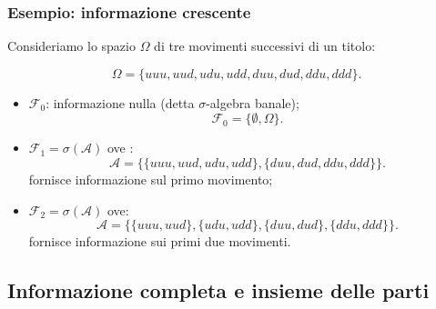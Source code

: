 \documentclass[handout]{beamer}%
\newenvironment{stepitemize}{\begin{itemize}[<+->]}{\end{itemize} }
\providecommand{\F}{\mathcal{F}}
\providecommand{\1}{\mathbf{1}}
\providecommand{\QTR}[2]{\csname #1\endcsname{#2}}
\begin{document}
\begin{frame}%
%

\frametitle{Esempio: informazione crescente}%


Consideriamo lo spazio $\Omega$ di tre movimenti successivi di un titolo:%

\[
\Omega=\{uuu,uud,udu,udd,duu,dud,ddu,ddd\}.
\]


\medskip

\begin{stepitemize}
\item $\F_{0}$: informazione nulla (detta $\sigma$-algebra banale);
\[
\F_{0}=\{\emptyset,\Omega\}.
\]


\item $\F_{1}=\sigma(\mathcal{A})$ ove :
\[
\mathcal{A} =\{\{uuu,uud,udu,udd\}, \{duu,dud,ddu,ddd\}\}.
\]
fornisce informazione sul primo movimento;

\item $\F_{2}=\sigma(\mathcal{A})$ ove:
\[
\mathcal{A} =\{\{uuu,uud\},\{udu,udd\},\{duu,dud\},\{ddu,ddd\}\}.
\]
fornisce informazione sui primi due movimenti.
\end{stepitemize}%

\transboxout
\end{frame}%




\subsection{Informazione completa e insieme delle parti}%
\end{document}
